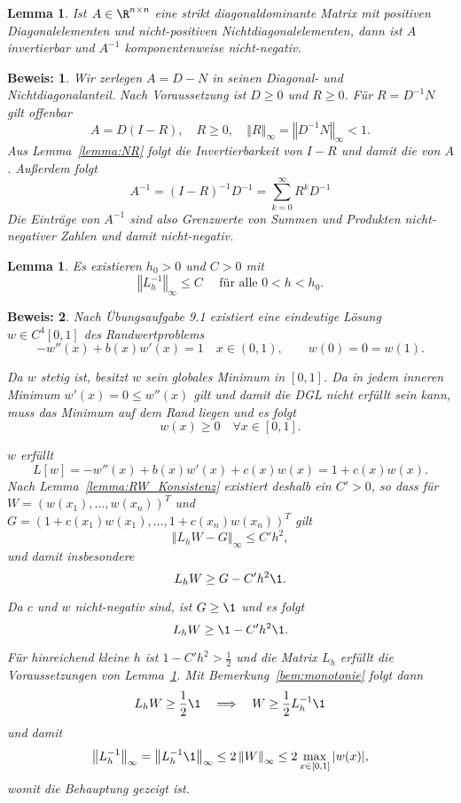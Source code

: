\documentclass[
]{mycourse}
\theoremstyle{mythm}
\newtheorem{lemma}[theorem]{Lemma}
\theoremstyle{break}
\newtheorem*{beweis}{Beweis:}
\newcommand{\norm}[1]{\left\Vert#1\right\Vert}		%
\begin{document}
\begin{lemma}\label{lemma:wann_M}
Ist $A\in \R^{n\times n}$ eine strikt diagonaldominante Matrix mit positiven Diagonalelementen und nicht-positiven Nichtdiagonalelementen, dann ist $A$ invertierbar und $A^{-1}$ komponentenweise nicht-negativ.
\end{lemma}
\begin{beweis}
Wir zerlegen $A=D-N$ in seinen Diagonal- und Nichtdiagonalanteil. Nach Voraussetzung ist $D\geq 0$ und $R\geq 0$. Für $R=D^{-1} N$ gilt offenbar
\[
A=D (I-R), \quad R\geq 0, \quad \norm{R}_\infty=\norm{D^{-1} N}_\infty<1.
\]
Aus Lemma~\ref{lemma:NR} folgt die Invertierbarkeit von $I-R$ und damit die von $A$.
Außerdem folgt
\[
A^{-1}=(I-R)^{-1} D^{-1} =\sum_{k=0}^\infty {R^k} D^{-1}
\]
Die Einträge von $A^{-1}$ sind also Grenzwerte von Summen und Produkten nicht-negativer Zahlen und damit nicht-negativ.
\end{beweis}


\begin{lemma}\label{lemma:RW_stabil}
Es existieren $h_0>0$ und $C>0$ mit 
\[
\norm{L_h^{-1}}_\infty\leq C \quad \mbox{ für alle } 0<h<h_0.
\]
\end{lemma}
\begin{beweis}
Nach Übungsaufgabe 9.1 existiert eine eindeutige Lösung $w\in C^4[0,1]$ des Randwertproblems
\[
-w''(x) + b(x)w'(x) = 1 \quad x\in (0,1), \qquad w(0)=0=w(1).
\]

Da $w$ stetig ist, besitzt $w$ sein globales Minimum in $[0,1]$. Da in jedem inneren Minimum $w'(x)=0\leq w''(x)$
gilt und damit die DGL nicht erfüllt sein kann, muss das Minimum auf dem Rand liegen und es folgt
\[
w(x)\geq 0 \quad \forall x\in [0,1].
\]


$w$ erfüllt
\[
L[w]=-w''(x) + b(x)w'(x) + c(x)w(x)= 1+c(x)w(x).
\]
Nach Lemma~\ref{lemma:RW_Konsistenz} existiert deshalb ein $C'>0$, so dass für 
$W=(w(x_1),\ldots,w(x_{n}))^T$ 
und $G=(1+c(x_1)w(x_1),\ldots,1+c(x_n)w(x_{n}))^T$ gilt
\[
\norm{L_h W - G}_\infty \leq C' h^2,
\]
und damit insbesondere
\[
L_h W \geq G- C'h^2 \1.
\]

Da $c$ und $w$ nicht-negativ sind, ist $G\geq \1$ und es folgt
\[
L_h W \geq \1 - C' h^2\1.
\]

Für hinreichend kleine $h$ ist $1-C'h^2>\frac{1}{2}$ und die Matrix 
$L_h$ erfüllt die Voraussetzungen von Lemma~\ref{lemma:wann_M}. Mit Bemerkung~\ref{bem:monotonie}
folgt dann
\[
L_h W\geq \frac{1}{2} \1 \quad \Longrightarrow \quad W\geq \frac{1}{2}{L_h^{-1}\1}
\]
und damit 
\[
\norm{L_h^{-1}}_\infty = \norm{L_h^{-1} \1}_\infty \leq 2 \norm{W}_\infty\leq 2 \max_{x\in [0,1]} |w(x)|,
\]
womit die Behauptung gezeigt ist.
\end{beweis}
\end{document}
